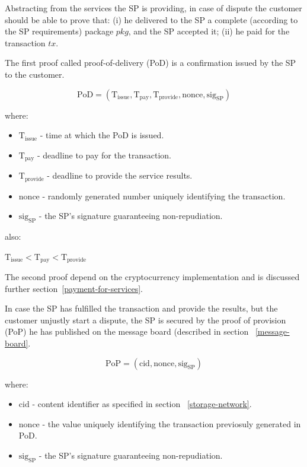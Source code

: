 \documentclass{ieeeaccess}
\begin{document}
Abstracting from the services the SP is providing, in case of dispute
the customer should be able to prove that: (i) he delivered to the SP a
complete (according to the SP requirements) package \(pkg\), and the SP
accepted it; (ii) he paid for the transaction \(tx\).

The first proof called proof-of-delivery (PoD) is a confirmation issued
by the SP to the customer.

\[\mathrm{PoD} = (\mathrm{T}_\mathrm{issue}, \mathrm{T}_\mathrm{pay}, \mathrm{T}_\mathrm{provide}, \mathrm{nonce}, \mathrm{sig}_\mathrm{SP})\]

where:

\begin{itemize}

\item
  \(\mathrm{T}_\mathrm{issue}\) - time at which the PoD is issued.
\item
  \(\mathrm{T}_\mathrm{pay}\) - deadline to pay for the transaction.
\item
  \(\mathrm{T}_\mathrm{provide}\) - deadline to provide the service
  results.
\item
  \(\mathrm{nonce}\) - randomly generated number uniquely identifying
  the transaction.
\item
  \(\mathrm{sig}_\mathrm{SP}\) - the SP's signature guaranteeing
  non-repudiation.
\end{itemize}

also:

\(\mathrm{T}_\mathrm{issue} < \mathrm{T}_\mathrm{pay} < \mathrm{T}_\mathrm{provide}\)

The second proof depend on the cryptocurrency implementation and is
discussed further section~\ref{payment-for-services}.

In case the SP has fulfilled the transaction and provide the results,
but the customer unjustly start a dispute, the SP is secured by the
proof of provision (PoP) he has published on the message board (described in section ~\ref{message-board}.

\[\mathrm{PoP} = (\mathrm{cid}, \mathrm{nonce}, \mathrm{sig}_\mathrm{SP})\]

where:

\begin{itemize}

\item
  \(\mathrm{cid}\) - content identifier as specified in section ~\ref{storage-network}.
\item
  \(\mathrm{nonce}\) - the value uniquely identifying the transaction
  previosuly generated in PoD.
\item
  \(\mathrm{sig}_\mathrm{SP}\) - the SP's signature guaranteeing
  non-repudiation.
\end{itemize}
\end{document}
